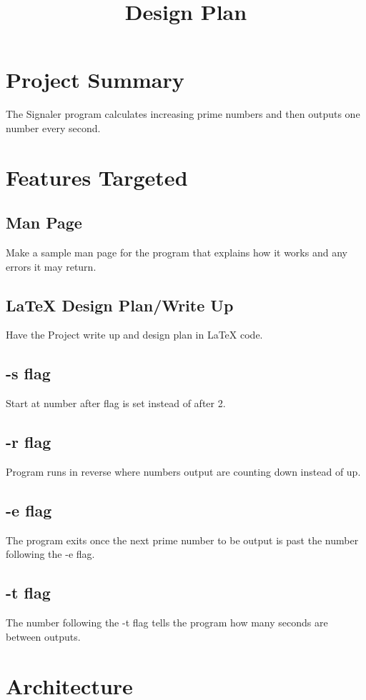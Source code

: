 \documentclass{article}
\title{Design Plan}
\begin{document}
  \maketitle
  \section*{Project Summary}
  The Signaler program calculates increasing prime numbers and then outputs one number every second. 
  \section*{Features Targeted}
  \subsection*{Man Page}
  Make a sample man page for the program that explains how it works and any errors it may return.
  \subsection*{LaTeX Design Plan/Write Up}
  Have the Project write up and design plan in LaTeX code.
  \subsection*{-s flag}
  Start at number after flag is set instead of after 2.
  \subsection*{-r flag}
  Program runs in reverse where numbers output are counting down instead of up. 
  \subsection*{-e flag}
  The program exits once the next prime number to be output is past the number following the -e flag.
  \subsection*{-t flag}
  The number following the -t flag tells the program how many seconds are between outputs.
  \section*{Architecture}
\end{document}
